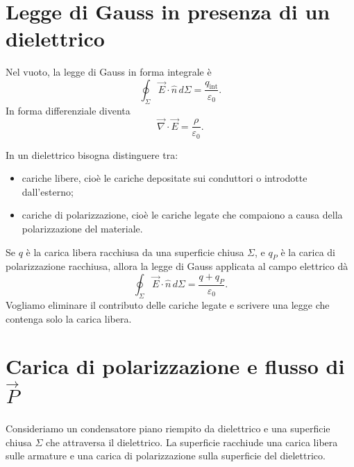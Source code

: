 \documentclass[a4paper]{article}
\begin{document}
\section{Legge di Gauss in presenza di un dielettrico}

Nel vuoto, la legge di Gauss in forma integrale è
\[
    \oint_\Sigma \vec{E}\cdot\hat{n}\,d\Sigma=\frac{q_{\mathrm{int}}}{\varepsilon_0}.
\]
In forma differenziale diventa
\[
    \vec{\nabla}\cdot\vec{E}=\frac{\rho}{\varepsilon_0}.
\]

In un dielettrico bisogna distinguere tra:
\begin{itemize}
    \item cariche libere, cioè le cariche depositate sui conduttori o introdotte dall'esterno;
    \item cariche di polarizzazione, cioè le cariche legate che compaiono a causa della polarizzazione del materiale.
\end{itemize}

Se \(q\) è la carica libera racchiusa da una superficie chiusa \(\Sigma\), e \(q_P\) è la carica di polarizzazione racchiusa, allora la legge di Gauss applicata al campo elettrico dà
\[
    \oint_\Sigma \vec{E}\cdot\hat{n}\,d\Sigma=\frac{q+q_P}{\varepsilon_0}.
\]
Vogliamo eliminare il contributo delle cariche legate e scrivere una legge che contenga solo la carica libera.

\section{Carica di polarizzazione e flusso di \(\vec{P}\)}

Consideriamo un condensatore piano riempito da dielettrico e una superficie chiusa \(\Sigma\) che attraversa il dielettrico. La superficie racchiude una carica libera sulle armature e una carica di polarizzazione sulla superficie del dielettrico.

\begin{center}
\end{center}
\end{document}

